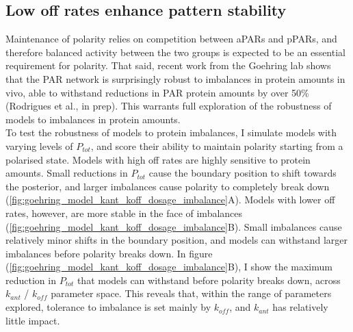 \documentclass[12pt]{"report"}
\begin{document}
\subsection{Low off rates enhance pattern stability}

Maintenance of polarity relies on competition between aPARs and pPARs, and therefore balanced activity between the two groups is expected to be an essential requirement for polarity. That said, recent work from the Goehring lab shows that the PAR network is surprisingly robust to imbalances in protein amounts in vivo, able to withstand reductions in PAR protein amounts by over 50\% (Rodrigues et al., in prep). This warrants full exploration of the robustness of models to imbalances in protein amounts.\\

To test the robustness of models to protein imbalances, I simulate models with varying levels of $P_{tot}$, and score their ability to maintain polarity starting from a polarised state. Models with high off rates are highly sensitive to protein amounts. Small reductions in $P_{tot}$ cause the boundary position to shift towards the posterior, and larger imbalances cause polarity to completely break down (\cref{fig:goehring_model_kant_koff_dosage_imbalance}A). Models with lower off rates, however, are more stable in the face of imbalances (\cref{fig:goehring_model_kant_koff_dosage_imbalance}B). Small imbalances cause relatively minor shifts in the boundary position, and models can withstand larger imbalances before polarity breaks down. In figure (\ref{fig:goehring_model_kant_koff_dosage_imbalance}B), I show the maximum reduction in $P_{tot}$ that models can withstand before polarity breaks down, across $k_{ant}$ / $k_{off}$ parameter space. This reveals that, within the range of parameters explored, tolerance to imbalance is set mainly by $k_{off}$, and $k_{ant}$ has relatively little impact.\\
\end{document}
